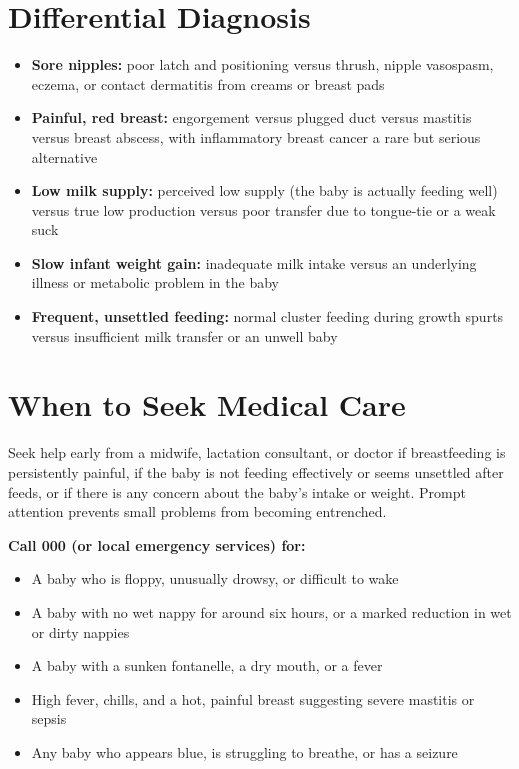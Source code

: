 \section*{Differential Diagnosis}
\begin{itemize}
    \item \textbf{Sore nipples:} poor latch and positioning versus thrush, nipple vasospasm, eczema, or contact dermatitis from creams or breast pads
    \item \textbf{Painful, red breast:} engorgement versus plugged duct versus mastitis versus breast abscess, with inflammatory breast cancer a rare but serious alternative
    \item \textbf{Low milk supply:} perceived low supply (the baby is actually feeding well) versus true low production versus poor transfer due to tongue-tie or a weak suck
    \item \textbf{Slow infant weight gain:} inadequate milk intake versus an underlying illness or metabolic problem in the baby
    \item \textbf{Frequent, unsettled feeding:} normal cluster feeding during growth spurts versus insufficient milk transfer or an unwell baby
\end{itemize}

\section*{When to Seek Medical Care}
Seek help early from a midwife, lactation consultant, or doctor if breastfeeding is persistently painful, if the baby is not feeding effectively or seems unsettled after feeds, or if there is any concern about the baby's intake or weight. Prompt attention prevents small problems from becoming entrenched.

\textbf{Call 000 (or local emergency services) for:}
\begin{itemize}
    \item A baby who is floppy, unusually drowsy, or difficult to wake
    \item A baby with no wet nappy for around six hours, or a marked reduction in wet or dirty nappies
    \item A baby with a sunken fontanelle, a dry mouth, or a fever
    \item High fever, chills, and a hot, painful breast suggesting severe mastitis or sepsis
    \item Any baby who appears blue, is struggling to breathe, or has a seizure
\end{itemize}

